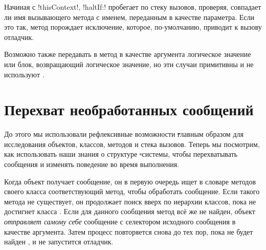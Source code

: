 \documentclass[a4paper,10pt,twoside]{book}
\begin{document}
Начиная с \ct!thisContext!, \ct!haltIf:! пробегает по стеку вызовов, проверяя, совпадает ли имя вызывающего метода с именем, переданным в качестве параметра. 
Если это так, метод порождает исключение, которое, по-умолчанию, приводит к вызову отладчик.

Возможно также передавать в метод  в качестве аргумента логическое значение или блок, возвращающий логическое значение, но эти случаи примитивны и не используют .

\section{Перехват необработанных сообщений}

До этого мы использовали рефлексивные возможности \st главным образом для исследования объектов, классов, методов и стека вызовов. Теперь мы посмотрим, как использовать наши знания о структуре \st-системы, чтобы перехватывать сообщения и изменять поведение во время выполнения.

Когда объект получает сообщение, он в первую очередь ищет в словаре методов своего класса соответствующий метод, чтобы обработать сообщение.
Если такого метода не существует, он продолжает поиск вверх по иерархии классов, пока не достигнет класса . Если для данного сообщения метод всё же не найден, объект \emph{отправляет самому себе} сообщение  с селектором исходного сообщения в качестве аргумента.
Затем процесс повторяется снова до тех пор, пока не будет найден , и не запустится отладчик.
\end{document}
